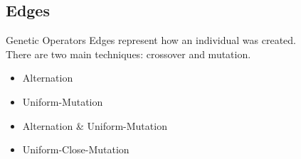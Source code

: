 \documentclass{beamer}
\begin{document}
\subsection[Edges]{Edges}

\begin{frame}{Genetic Operators}
Edges represent how an individual was created. \\
There are two main techniques: crossover and mutation.
\begin{itemize}
\item Alternation
\item Uniform-Mutation
\item Alternation \& Uniform-Mutation
\item Uniform-Close-Mutation
\end{itemize} 
\end{frame}
\end{document}
